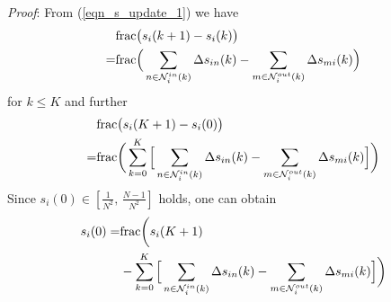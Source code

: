 \documentclass{IEEEtran}
\begin{document}
{\it Proof}: From (\ref{eqn_s_update_1}) we have
\begin{equation}\label{theorem_3_1}
	\begin{aligned}
		& {\rm frac}\big(s_i(k+1)-s_i(k) \big) \\
		= & {\rm frac}\Big(\sum_{n\in \mathcal{N}_i^{in}(k)} \Delta s_{in}(k) - \sum_{m\in \mathcal{N}_i^{out}(k)} \Delta s_{mi}(k) \Big)
	\end{aligned}
\end{equation}
for $k \leq K$ and further
\begin{equation}\label{theorem_3_2}
	\begin{aligned}
		& {\rm frac}\big(s_i(K+1)-s_i(0) \big) \\
		= & {\rm frac}\bigg(\sum_{k=0}^{K} \Big[\sum_{n\in \mathcal{N}_i^{in}(k)} \Delta s_{in}(k) - \sum_{m\in \mathcal{N}_i^{out}(k)} \Delta s_{mi}(k) \Big] \bigg)
	\end{aligned}
\end{equation}
Since $s_i(0) \in [\frac{1}{N^2}, \, \frac{N-1}{N^2}]$ holds, one can obtain
\begin{equation}\label{theorem_3_3}
	\begin{aligned}
		s_i(0) = & {\rm frac}\bigg(s_i(K+1) \\
		& - \sum_{k=0}^{K} \Big[\sum_{n\in \mathcal{N}_i^{in}(k)} \Delta s_{in}(k) - \sum_{m\in \mathcal{N}_i^{out}(k)} \Delta s_{mi}(k) \Big] \bigg)
	\end{aligned}
\end{equation}
\end{document}
